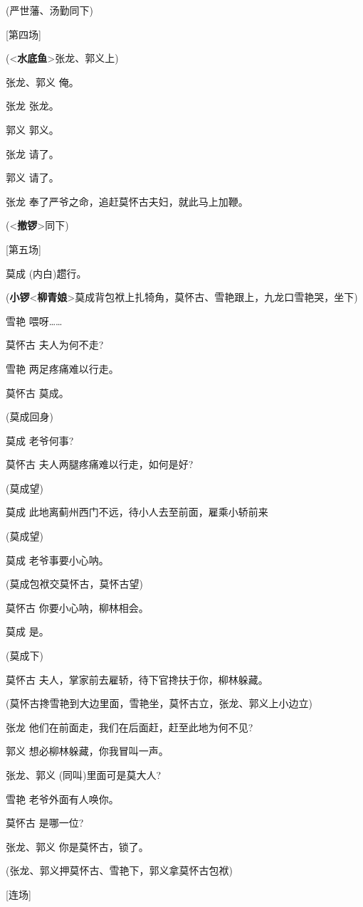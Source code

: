 (严世藩、汤勤同下)

{[}第四场{]}

(\textless{}\textbf{水底鱼}\textgreater{}张龙、郭义上)

张龙、郭义 俺。

张龙 张龙。

郭义 郭义。

张龙 请了。

郭义 请了。

张龙 奉了严爷之命，追赶莫怀古夫妇，就此马上加鞭。

(\textless{}\textbf{撤锣}\textgreater{}同下)

{[}第五场{]}

莫成 (内白)趱行。

(\textbf{小锣}\textless{}\textbf{柳青娘}\textgreater{}莫成背包袱上扎犄角，莫怀古、雪艳跟上，九龙口雪艳哭，坐下)

雪艳 喂呀\ldots{}\ldots{}

莫怀古 夫人为何不走?

雪艳 两足疼痛难以行走。

莫怀古 莫成。

(莫成回身)

莫成 老爷何事?

莫怀古 夫人两腿疼痛难以行走，如何是好?

(莫成望)

莫成 此地离蓟州西门不远，待小人去至前面，雇乘小轿前来

(莫成望)

莫成 老爷事要小心呐。

(莫成包袱交莫怀古，莫怀古望)

莫怀古 你要小心呐，柳林相会。

莫成 是。

(莫成下)

莫怀古 夫人，掌家前去雇轿，待下官搀扶于你，柳林躲藏。

(莫怀古搀雪艳到大边里面，雪艳坐，莫怀古立，张龙、郭义上小边立)

张龙 他们在前面走，我们在后面赶，赶至此地为何不见?

郭义 想必柳林躲藏，你我冒叫一声。

张龙、郭义 (同叫)里面可是莫大人?

雪艳 老爷外面有人唤你。

莫怀古 是哪一位?

张龙、郭义 你是莫怀古，锁了。

(张龙、郭义押莫怀古、雪艳下，郭义拿莫怀古包袱)

{[}连场{]}

